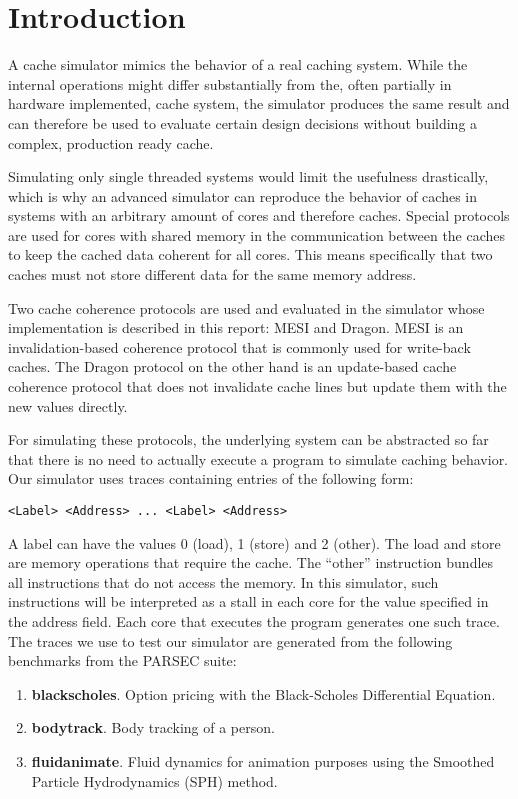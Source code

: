 \section{Introduction}

A cache simulator mimics the behavior of a real caching system. While the
internal operations might differ substantially from the, often partially in
hardware implemented, cache system, the simulator produces the same result and
can therefore be used to evaluate certain design decisions without building a
complex, production ready cache.

Simulating only single threaded systems would limit the usefulness drastically,
which is why an advanced simulator can reproduce the behavior of caches in
systems with an arbitrary amount of cores and therefore caches. Special
protocols are used for cores with shared memory in the communication between the
caches to keep the cached data coherent for all cores. This means specifically
that two caches must not store different data for the same memory address.

Two cache coherence protocols are used and evaluated in the simulator whose implementation
is described in this report: MESI and Dragon. MESI is an invalidation-based
coherence protocol that is commonly used for write-back caches. The Dragon
protocol on the other hand is an update-based cache coherence protocol that does
not invalidate cache lines but update them with the new values directly.

For simulating these protocols, the underlying system can be abstracted so far
that there is no need to actually execute a program to simulate caching
behavior. Our simulator uses traces containing entries of the following form:
\begin{lstlisting}[label=lst:trace]
<Label> <Address> ... <Label> <Address>
\end{lstlisting}
A label can have the values 0 (load), 1 (store) and 2 (other). The load and
store are memory operations that require the cache. The ``other'' instruction
bundles all instructions that do not access the memory. In this simulator, such instructions will be
interpreted as a stall in each core for the value specified in the address
field. Each core that executes the program generates one such trace. The
traces we use to test our simulator are generated from the following benchmarks from the
PARSEC suite:
\begin{enumerate}
    \item \textbf{blackscholes}. Option pricing with the Black-Scholes Differential
          Equation.
    \item \textbf{bodytrack}. Body tracking of a person.
    \item \textbf{fluidanimate}. Fluid dynamics for animation purposes using the
          Smoothed Particle Hydrodynamics (SPH) method.
\end{enumerate}

